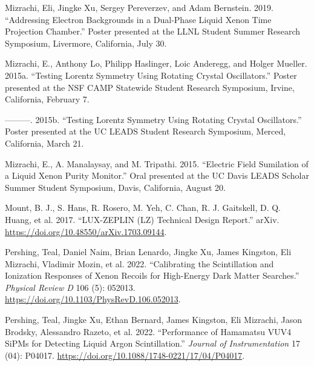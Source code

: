 \documentclass[
  10pt,
  letterpaper,
  DIV=11,
  numbers=noendperiod]{scrartcl}
\newlength{\cslhangindent}
\newlength{\cslentryspacingunit} %
\newenvironment{CSLReferences}[2] %
 {%
  \setlength{\parindent}{0pt}
  \ifodd #1
  \let\oldpar\par
  \def\par{\hangindent=\cslhangindent\oldpar}
  \fi
  \setlength{\parskip}{#2\cslentryspacingunit}
 }%
 {}
\begin{document}
\begin{CSLReferences}{1}{0}
\leavevmode{}%
Mizrachi, Eli, Jingke Xu, Sergey Pereverzev, and Adam Bernstein. 2019.
{``Addressing {Electron Backgrounds} in a {Dual-Phase Liquid Xenon Time
Projection Chamber}.''} Poster presented at the {LLNL Student Summer
Research Symposium}, {Livermore, California}, July 30.

\leavevmode{}%
Mizrachi, E., Anthony Lo, Philipp Haslinger, Loic Anderegg, and Holger
Mueller. 2015a. {``Testing {Lorentz Symmetry Using Rotating Crystal
Oscillators}.''} Poster presented at the {NSF CAMP Statewide Student
Research Symposium}, {Irvine, California}, February 7.

\leavevmode{}%
---------. 2015b. {``Testing {Lorentz Symmetry Using Rotating Crystal
Oscillators}.''} Poster presented at the {UC LEADS Student Research
Symposium}, {Merced, California}, March 21.

\leavevmode{}%
Mizrachi, E., A. Manalaysay, and M. Tripathi. 2015. {``Electric {Field
Sumilation} of a {Liquid Xenon Purity Monitor}.''} Oral presented at the
{UC Davis LEADS Scholar Summer Student Symposium}, {Davis, California},
August 20.

\leavevmode{}%
Mount, B. J., S. Hans, R. Rosero, M. Yeh, C. Chan, R. J. Gaitskell, D.
Q. Huang, et al. 2017. {``{LUX-ZEPLIN} ({LZ}) {Technical Design
Report}.''} {arXiv}. \url{https://doi.org/10.48550/arXiv.1703.09144}.

\leavevmode{}%
Pershing, Teal, Daniel Naim, Brian Lenardo, Jingke Xu, James Kingston,
Eli Mizrachi, Vladimir Mozin, et al. 2022. {``Calibrating the
Scintillation and Ionization Responses of Xenon Recoils for High-Energy
Dark Matter Searches.''} \emph{Physical Review D} 106 (5): 052013.
\url{https://doi.org/10.1103/PhysRevD.106.052013}.

\leavevmode{}%
Pershing, Teal, Jingke Xu, Ethan Bernard, James Kingston, Eli Mizrachi,
Jason Brodsky, Alessandro Razeto, et al. 2022. {``Performance of
{Hamamatsu VUV4 SiPMs} for Detecting Liquid Argon Scintillation.''}
\emph{Journal of Instrumentation} 17 (04): P04017.
\url{https://doi.org/10.1088/1748-0221/17/04/P04017}.

\end{CSLReferences}
\end{document}
